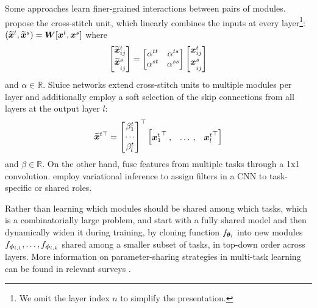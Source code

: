 \documentclass[10pt]{article} %
\begin{document}
Some approaches learn finer-grained interactions between pairs of modules.
\cite{Misra2016} propose the cross-stitch unit, which linearly combines the inputs at every layer\footnote{We omit the layer index $n$ to simplify the presentation.}: $(\widetilde{{\bm{x}}}^t, \widetilde{{\bm{x}}}^s) = {\bm{W}}[{\bm{x}}^t, {\bm{x}}^s]$ where
\begin{equation*}
\begin{bmatrix}
\widetilde{{\bm{x}}}_{ij}^t \\[2pt]
\widetilde{{\bm{x}}}_{\strut ij}^s
\end{bmatrix}
= \begin{bmatrix}
\alpha^{tt}  & \alpha^{ts} \\
\alpha^{st}  & \alpha^{ss} \\
\end{bmatrix}
\begin{bmatrix}
{\bm{x}}_{ij}^t \\[2pt]
{\bm{x}}_{\strut ij}^s
\end{bmatrix}
\end{equation*}
and $\alpha \in \mathbb{R}$. Sluice networks \citep{ruder2019latent} extend cross-stitch units to multiple modules per layer and additionally employ a soft selection of the skip connections from all layers at the output layer $l$:
\begin{equation*}
{\widetilde{{\bm{x}}}^{t\top}} = 
\begin{bmatrix}
           \beta_1^t \\
           \cdots \\
           \beta_l^t
         \end{bmatrix}^\top
\begin{bmatrix}
{{\bm{x}}_{1}^t}^\top \: , & \ldots \: , & {{\bm{x}}_{l}^t}^\top
\end{bmatrix}
\end{equation*}
and $\beta \in \mathbb{R}$. On the other hand, \citet{gao2019nddr} fuse features from multiple tasks through a 1x1 convolution. \citet{bragman2019stochastic} employ variational inference to assign filters in a CNN to task-specific or shared roles.

Rather than learning which modules should be shared among which tasks, which is a combinatorially large problem, \citet{lu2017fully} and \citet{vandenhende2019branched} start with a fully shared model and then dynamically widen it during training, by cloning function $f_{{\bm{\theta}}_i}$ into new modules $f_{{\bm{\phi}}_{i,1}}, \ldots, f_{{\bm{\phi}}_{i,k}}$ shared among a smaller subset of tasks, in top-down order across layers. More information on parameter-sharing strategies in multi-task learning can be found in relevant surveys \citep{ruder2017overview,crawshaw2020multi}.
\end{document}
